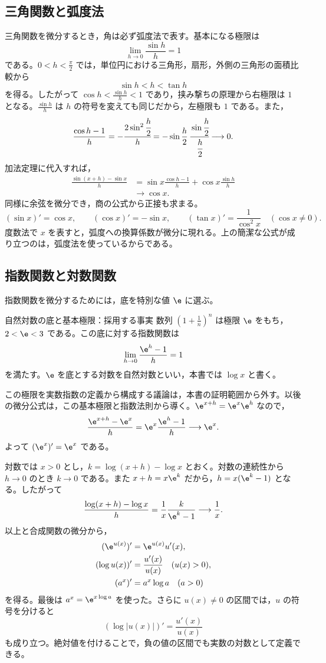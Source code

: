 \subsection{三角関数と弧度法}
三角関数を微分するとき，角は必ず弧度法で表す。基本になる極限は
\[
 \lim_{h\to0}\frac{\sin h}{h}=1
\]
である。$0<h<\frac\pi2$ では，単位円における三角形，扇形，外側の三角形の面積比較から
\[
 \sin h<h<\tan h
\]
を得る。したがって $\cos h<\frac{\sin h}{h}<1$ であり，挟み撃ちの原理から右極限は $1$ となる。$\frac{\sin h}{h}$ は $h$ の符号を変えても同じだから，左極限も $1$ である。また，
\[
 \frac{\cos h-1}{h}
 =-\cfrac{2\sin^2\cfrac h2}{h}
 =-\sin\frac h2\,\cfrac{\sin\cfrac h2}{\cfrac h2}
 \longrightarrow0.
\]
加法定理に代入すれば，
\begin{align*}
 \frac{\sin(x+h)-\sin x}{h}
 &=\sin x\frac{\cos h-1}{h}
   +\cos x\frac{\sin h}{h}\\
 &\longrightarrow\cos x.
\end{align*}
同様に余弦を微分でき，商の公式から正接も求まる。
\[
 (\sin x)'=\cos x,\qquad
 (\cos x)'=-\sin x,\qquad
 (\tan x)'=\frac1{\cos^2x}\quad(\cos x\ne0).
\]
度数法で $x$ を表すと，弧度への換算係数が微分に現れる。上の簡潔な公式が成り立つのは，弧度法を使っているからである。

\subsection{指数関数と対数関数}
指数関数を微分するためには，底を特別な値 $\e$ に選ぶ。
\begin{theorem}{自然対数の底と基本極限：採用する事実}
数列 $\left(1+\frac1n\right)^n$ は極限 $\e$ をもち，$2<\e<3$ である。この底に対する指数関数は
\[
 \lim_{h\to0}\frac{\e^h-1}{h}=1
\]
を満たす。$\e$ を底とする対数を自然対数といい，本書では $\log x$ と書く。
\end{theorem}

この極限を実数指数の定義から構成する議論は，本書の証明範囲から外す。以後の微分公式は，この基本極限と指数法則から導く。$\e^{x+h}=\e^x\e^h$ なので，
\[
 \frac{\e^{x+h}-\e^x}{h}
 =\e^x\frac{\e^h-1}{h}\longrightarrow\e^x.
\]
よって $(\e^x)'=\e^x$ である。

対数では $x>0$ とし，$k=\log(x+h)-\log x$ とおく。対数の連続性から $h\to0$ のとき $k\to0$ である。また $x+h=x\e^k$ だから，$h=x(\e^k-1)$ となる。したがって
\[
 \frac{\log(x+h)-\log x}{h}
 =\frac1x\frac{k}{\e^k-1}\longrightarrow\frac1x.
\]
以上と合成関数の微分から，
\begin{align*}
 (\e^{u(x)})'&=\e^{u(x)}u'(x),\\
 (\log u(x))'&=\frac{u'(x)}{u(x)}\quad(u(x)>0),\\
 (a^x)'&=a^x\log a\quad(a>0)
\end{align*}
を得る。最後は $a^x=\e^{x\log a}$ を使った。さらに $u(x)\ne0$ の区間では，$u$ の符号を分けると
\[
 (\log|u(x)|)'=\frac{u'(x)}{u(x)}
\]
も成り立つ。絶対値を付けることで，負の値の区間でも実数の対数として定義できる。

